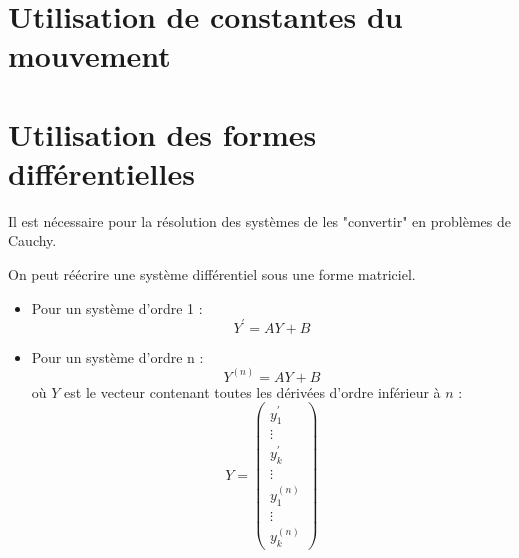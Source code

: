 \section{Utilisation de constantes du mouvement}
\section{Utilisation des formes différentielles}












Il est nécessaire pour la résolution des systèmes de les "convertir" en problèmes de Cauchy.
\begin{prop}
On peut réécrire une système différentiel sous une forme matriciel.
\begin{itemize}
    \item Pour un système d'ordre  1 : $$Y^{\prime}=AY+B$$
    \item Pour un système d'ordre n :$$Y^{(n)}=AY+B$$
    où $Y$ est le vecteur contenant toutes les dérivées d'ordre inférieur à $n$ :
    $$Y=\begin{pmatrix}y_1^{\prime}\\\vdots\\y_k^{\prime}\\\vdots\\y_1^{(n)}\\\vdots\\y_k^{(n)}\end{pmatrix}$$
\end{itemize}
\end{prop}
